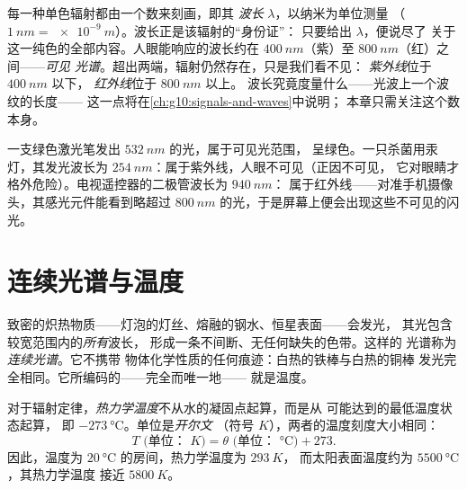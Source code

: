 \begin{definition}\label{def:g10:light-spectra:wavelength}
每一种单色辐射都由一个数来刻画，即其
\emph{波长} $\lambda$，以纳米为单位测量
（$\qty{1}{nm} = \qty{e-9}{m}$）。波长正是该辐射的“身份证”：
只要给出 $\lambda$，便说尽了
关于这一纯色的全部内容。人眼能响应的波长约在
$\qty{400}{nm}$（紫）至 $\qty{800}{nm}$（红）之间——\emph{可见
光谱}。超出两端，辐射仍然存在，只是我们看不见：
\emph{紫外线}位于 $\qty{400}{nm}$ 以下，
\emph{红外线}位于 $\qty{800}{nm}$ 以上。
波长究竟度量什么——光波上一个波纹的长度——
这一点将在\cref{ch:g10:signals-and-waves}中说明；
本章只需关注这个数本身。
\end{definition}

\begin{example}[读取波长]\label{ex:g10:light-spectra:classify}
一支绿色激光笔发出 $\qty{532}{nm}$ 的光，属于可见光范围，
呈绿色。一只杀菌用汞灯，其发光波长为
$\qty{254}{nm}$：属于紫外线，人眼不可见（正因不可见，
它对眼睛才格外危险）。电视遥控器的二极管波长为 $\qty{940}{nm}$：
属于红外线——对准手机摄像头，其感光元件能看到略超过
$\qty{800}{nm}$ 的光，于是屏幕上便会出现这些不可见的闪光。
\end{example}

\section{连续光谱与温度}

\begin{definition}[连续光谱]\label{def:g10:light-spectra:continuous}
致密的炽热物质——灯泡的灯丝、熔融的钢水、恒星表面——会发光，
其光包含较宽范围内的\emph{所有}波长，
形成一条不间断、无任何缺失的色带。这样的
光谱称为\emph{连续光谱}。它不携带
物体化学性质的任何痕迹：白热的铁棒与白热的铜棒
发光完全相同。它所编码的——完全而唯一地——
就是温度。
\end{definition}

\begin{definition}[热力学温度]\label{def:g10:light-spectra:kelvin}
对于辐射定律，\emph{热力学温度}不从水的凝固点起算，而是从
可能达到的最低温度状态起算，
即 $\qty{-273}{\degreeCelsius}$。单位是\emph{开尔文}
（符号 $\unit{K}$），两者的温度刻度大小相同：
\[
T \text{ (单位： } \unit{K}) = \theta \text{ (单位： } \unit{\degreeCelsius}) + 273 .
\]
因此，温度为 $\qty{20}{\degreeCelsius}$ 的房间，热力学温度为 $\qty{293}{K}$，
而太阳表面温度约为 $\qty{5500}{\degreeCelsius}$，其热力学温度
接近 $\qty{5800}{K}$。
\end{definition}

